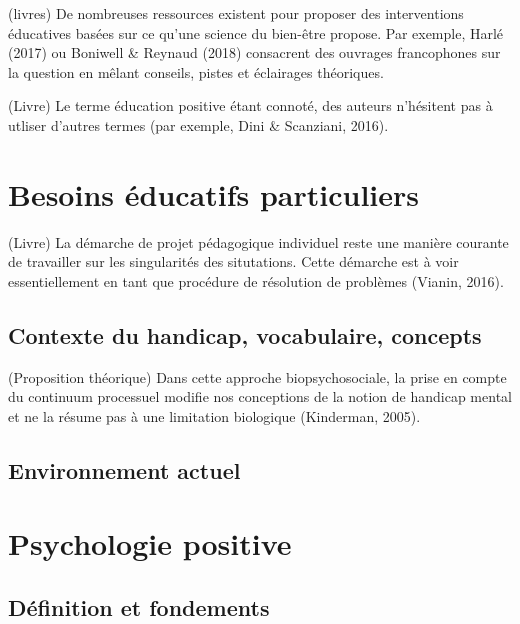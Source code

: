 \documentclass[
  french,
]{article}
\begin{document}
(livres) De nombreuses ressources existent pour proposer des interventions éducatives basées sur ce qu'une science du bien-être propose. Par exemple, Harlé (2017) ou Boniwell \& Reynaud (2018) consacrent des ouvrages francophones sur la question en mêlant conseils, pistes et éclairages théoriques.

(Livre) Le terme éducation positive étant connoté, des auteurs n'hésitent pas à utliser d'autres termes (par exemple, Dini \& Scanziani, 2016).

\hypertarget{besoins-uxe9ducatifs-particuliers}{%
\section{Besoins éducatifs particuliers}\label{besoins-uxe9ducatifs-particuliers}}

(Livre) La démarche de projet pédagogique individuel reste une manière courante de travailler sur les singularités des situtations. Cette démarche est à voir essentiellement en tant que procédure de résolution de problèmes (Vianin, 2016).

\hypertarget{contexte-du-handicap-vocabulaire-concepts}{%
\subsection{Contexte du handicap, vocabulaire, concepts}\label{contexte-du-handicap-vocabulaire-concepts}}

(Proposition théorique) Dans cette approche biopsychosociale, la prise en compte du continuum processuel modifie nos conceptions de la notion de handicap mental et ne la résume pas à une limitation biologique (Kinderman, 2005).

\hypertarget{environnement-actuel}{%
\subsection{Environnement actuel}\label{environnement-actuel}}

\hypertarget{psychologie-positive}{%
\section{Psychologie positive}\label{psychologie-positive}}

\hypertarget{duxe9finition-et-fondements}{%
\subsection{Définition et fondements}\label{duxe9finition-et-fondements}}
\end{document}
